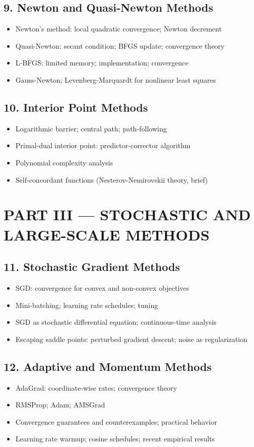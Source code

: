\subsection{9. Newton and Quasi-Newton Methods}
\begin{itemize}
\item Newton's method: local quadratic convergence; Newton decrement
\item Quasi-Newton: secant condition; BFGS update; convergence theory
\item L-BFGS: limited memory; implementation; convergence
\item Gauss-Newton; Levenberg-Marquardt for nonlinear least squares
\end{itemize}

\subsection{10. Interior Point Methods}
\begin{itemize}
\item Logarithmic barrier; central path; path-following
\item Primal-dual interior point: predictor-corrector algorithm
\item Polynomial complexity analysis
\item Self-concordant functions (Nesterov-Nemirovskii theory, brief)
\end{itemize}

\section{PART III --- STOCHASTIC AND LARGE-SCALE METHODS}

\subsection{11. Stochastic Gradient Methods}
\begin{itemize}
\item SGD: convergence for convex and non-convex objectives
\item Mini-batching; learning rate schedules; tuning
\item SGD as stochastic differential equation; continuous-time analysis
\item Escaping saddle points: perturbed gradient descent; noise as regularization
\end{itemize}

\subsection{12. Adaptive and Momentum Methods}
\begin{itemize}
\item AdaGrad: coordinate-wise rates; convergence theory
\item RMSProp; Adam; AMSGrad
\item Convergence guarantees and counterexamples; practical behavior
\item Learning rate warmup; cosine schedules; recent empirical results
\end{itemize}

